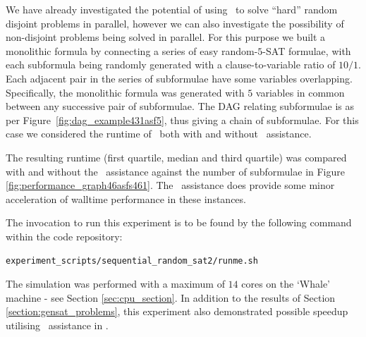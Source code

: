 \documentclass[
10pt, %
a4paper, %
oneside, %
headinclude,footinclude, %
BCOR5mm, %
]{scrartcl}
\begin{document}
We have already investigated the potential of using \dagster\ to solve ``hard'' random disjoint problems in parallel, however we can also investigate the possibility of non-disjoint problems being solved in parallel.
For this purpose we built a monolithic formula by connecting a series of easy random-$5$-SAT formulae, with each subformula being randomly generated with a clause-to-variable ratio of $10/1$.
Each adjacent pair in the series of subformulae have some variables overlapping.
Specifically, the monolithic formula was generated with $5$ variables in common between any successive pair of subformulae.
The DAG relating subformulae is as per Figure~\ref{fig:dag_example431asf5}, thus giving a chain of subformulae.
For this case we considered the runtime of \dagster\ both with and without \gnoveltyp\ assistance.

The resulting runtime (first quartile, median and third quartile) was compared with and without the \gnoveltyp\ assistance against the number of subformulae in Figure \ref{fig:performance_graph46asfs461}.
The \gnoveltyp\ assistance does provide some minor acceleration of walltime performance in these instances.

The invocation to run this experiment is to be found by the following command within the code repository:
\begin{Verbatim}[frame=single]
experiment_scripts/sequential_random_sat2/runme.sh
\end{Verbatim}

The simulation was performed with a maximum of $14$ cores on the `Whale' machine - see Section \ref{sec:cpu_section}.
In addition to the results of Section \ref{section:gensat_problems}, this experiment also demonstrated possible speedup utilising \gnoveltyp\ assistance in \dagster.
\end{document}

